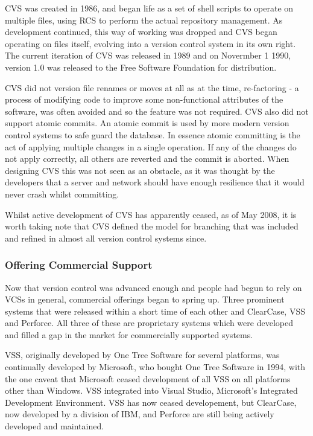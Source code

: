 CVS was created in 1986, and began life as a set of shell scripts to operate on multiple files, using RCS to perform the actual repository management.  As development continued, this way of working was dropped and CVS began operating on files itself, evolving into a version control system in its own right.  The current iteration of CVS was released in 1989 and on Novermber 1 1990, version 1.0 was released to the Free Software Foundation for distribution.

CVS did not version file renames or moves at all as at the time, re-factoring - a process of modifying code to improve some non-functional attributes of the software, was often avoided and so the feature was not required.  CVS also did not support atomic commits.  An atomic commit is used by more modern version control systems to safe guard the database.  In essence atomic committing is the act of applying multiple changes in a single operation.  If any of the changes do not apply correctly, all others are reverted and the commit is aborted.  When designing CVS this was not seen as an obstacle, as it was thought by the developers that a server and network should have enough resilience that it would never crash whilst committing.

Whilst active development of CVS has apparently ceased, as of May 2008, it is worth taking note that CVS defined the model for branching that was included and refined in almost all version control systems since.  

\subsubsection{Offering Commercial Support}
Now that version control was advanced enough and people had begun to rely on VCSs in general, commercial offerings began to spring up.  Three prominent systems that were released within a short time of each other and ClearCase, VSS and Perforce.  All three of these are proprietary systems which were developed and filled a gap in the market for commercially supported systems.  

VSS, originally developed by One Tree Software for several platforms, was continually developed by Microsoft, who bought One Tree Software in 1994, with the one caveat that Microsoft ceased development of all VSS on all platforms other than Windows.  VSS integrated into Visual Studio, Microsoft's Integrated Development Environment.  VSS has now ceased developement, but ClearCase, now developed by a division of IBM, and Perforce are still being actively developed and maintained.

